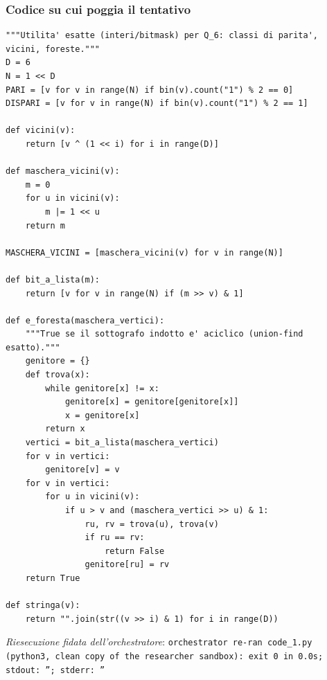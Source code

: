 \documentclass[11pt,a4paper]{article}
\begin{document}
\subsubsection{Codice su cui poggia il tentativo}
\begin{lstlisting}[caption={attempt\_001 code\_1 [python, rigore exact] — Shared exact utilities for Q\_6 (parity classes, neighbour bitmasks, union-find forest test — approvato dal Referee}]
"""Utilita' esatte (interi/bitmask) per Q_6: classi di parita', vicini, foreste."""
D = 6
N = 1 << D
PARI = [v for v in range(N) if bin(v).count("1") % 2 == 0]
DISPARI = [v for v in range(N) if bin(v).count("1") % 2 == 1]

def vicini(v):
    return [v ^ (1 << i) for i in range(D)]

def maschera_vicini(v):
    m = 0
    for u in vicini(v):
        m |= 1 << u
    return m

MASCHERA_VICINI = [maschera_vicini(v) for v in range(N)]

def bit_a_lista(m):
    return [v for v in range(N) if (m >> v) & 1]

def e_foresta(maschera_vertici):
    """True se il sottografo indotto e' aciclico (union-find esatto)."""
    genitore = {}
    def trova(x):
        while genitore[x] != x:
            genitore[x] = genitore[genitore[x]]
            x = genitore[x]
        return x
    vertici = bit_a_lista(maschera_vertici)
    for v in vertici:
        genitore[v] = v
    for v in vertici:
        for u in vicini(v):
            if u > v and (maschera_vertici >> u) & 1:
                ru, rv = trova(u), trova(v)
                if ru == rv:
                    return False
                genitore[ru] = rv
    return True

def stringa(v):
    return "".join(str((v >> i) & 1) for i in range(D))

\end{lstlisting}
\noindent\emph{Riesecuzione fidata dell'orchestratore}: \texttt{orchestrator re-ran code\_1.py (python3, clean copy of the researcher sandbox): exit 0 in 0.0s; stdout: ''; stderr: ''}
\end{document}
